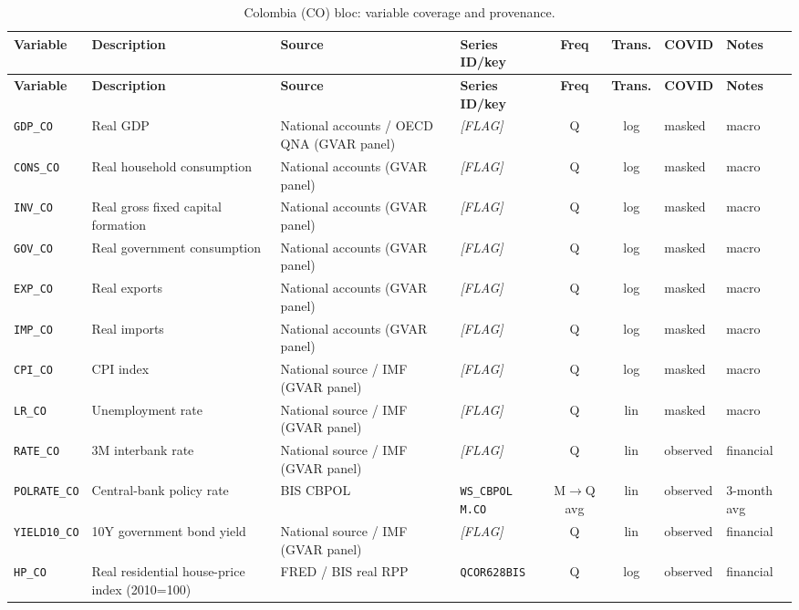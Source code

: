 {\footnotesize
\begin{longtable}{@{}llp{2.5cm}p{2.4cm}cclp{2.6cm}@{}}
\caption{Colombia (CO) bloc: variable coverage and provenance.}\label{tab:data:CO}\\
\toprule
\textbf{Variable} & \textbf{Description} & \textbf{Source} & \textbf{Series ID/key} & \textbf{Freq} & \textbf{Trans.} & \textbf{COVID} & \textbf{Notes} \\
\midrule
\endfirsthead
\toprule
\textbf{Variable} & \textbf{Description} & \textbf{Source} & \textbf{Series ID/key} & \textbf{Freq} & \textbf{Trans.} & \textbf{COVID} & \textbf{Notes} \\
\midrule
\endhead
\bottomrule
\endfoot
\texttt{GDP\_CO}  & Real GDP & National accounts / OECD QNA (GVAR panel) & \textit{[FLAG]} & Q & log & masked & macro \\
\texttt{CONS\_CO} & Real household consumption & National accounts (GVAR panel) & \textit{[FLAG]} & Q & log & masked & macro \\
\texttt{INV\_CO}  & Real gross fixed capital formation & National accounts (GVAR panel) & \textit{[FLAG]} & Q & log & masked & macro \\
\texttt{GOV\_CO}  & Real government consumption & National accounts (GVAR panel) & \textit{[FLAG]} & Q & log & masked & macro \\
\texttt{EXP\_CO}  & Real exports & National accounts (GVAR panel) & \textit{[FLAG]} & Q & log & masked & macro \\
\texttt{IMP\_CO}  & Real imports & National accounts (GVAR panel) & \textit{[FLAG]} & Q & log & masked & macro \\
\texttt{CPI\_CO}  & CPI index & National source / IMF (GVAR panel) & \textit{[FLAG]} & Q & log & masked & macro \\
\texttt{LR\_CO}   & Unemployment rate & National source / IMF (GVAR panel) & \textit{[FLAG]} & Q & lin & masked & macro \\
\texttt{RATE\_CO} & 3M interbank rate & National source / IMF (GVAR panel) & \textit{[FLAG]} & Q & lin & observed & financial \\
\texttt{POLRATE\_CO} & Central-bank policy rate & BIS CBPOL & \texttt{WS\_CBPOL M.CO} & M$\to$Q avg & lin & observed & 3-month avg \\
\texttt{YIELD10\_CO} & 10Y government bond yield & National source / IMF (GVAR panel) & \textit{[FLAG]} & Q & lin & observed & financial \\
\texttt{HP\_CO}   & Real residential house-price index (2010=100) & FRED / BIS real RPP & \texttt{QCOR628BIS} & Q & log & observed & financial \\

\end{longtable}}
